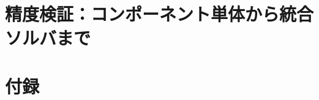 \documentclass[12pt, a4paper, titlepage, xelatex, ja=standard, oneside]{bxjsarticle}
\begin{document}
\clearpage
\part{精度検証：コンポーネント単体から統合ソルバまで}
\clearpage
\clearpage
\clearpage




\clearpage
\appendix
\part{付録}







\end{document}
